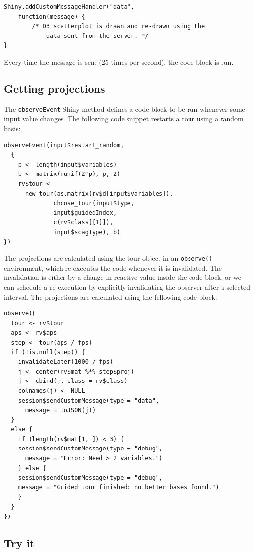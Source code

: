 \begin{verbatim}
Shiny.addCustomMessageHandler("data",
    function(message) {
        /* D3 scatterplot is drawn and re-drawn using the
            data sent from the server. */
}
\end{verbatim}

Every time the message is sent (25 times per second), the code-block is
run.

\hypertarget{getting-projections}{%
\subsection{Getting projections}\label{getting-projections}}

The \texttt{observeEvent} Shiny method defines a code block to be run
whenever some input value changes. The following code snippet restarts a
tour using a random basis:

\begin{verbatim}
observeEvent(input$restart_random,
  {
    p <- length(input$variables)
    b <- matrix(runif(2*p), p, 2)
    rv$tour <- 
      new_tour(as.matrix(rv$d[input$variables]),
              choose_tour(input$type, 
              input$guidedIndex,
              c(rv$class[[1]]), 
              input$scagType), b)
})
\end{verbatim}

The projections are calculated using the tour object in an
\texttt{observe()} environment, which re-executes the code whenever it
is invalidated. The invalidation is either by a change in reactive value
inside the code block, or we can schedule a re-execution by explicitly
invalidating the observer after a selected interval. The projections are
calculated using the following code block:

\begin{verbatim}
observe({
  tour <- rv$tour
  aps <- rv$aps
  step <- tour(aps / fps)
  if (!is.null(step)) {
    invalidateLater(1000 / fps)
    j <- center(rv$mat %*% step$proj)
    j <- cbind(j, class = rv$class)
    colnames(j) <- NULL
    session$sendCustomMessage(type = "data", 
      message = toJSON(j))
  }
  else {
    if (length(rv$mat[1, ]) < 3) {
    session$sendCustomMessage(type = "debug", 
      message = "Error: Need > 2 variables.")
    } else {
    session$sendCustomMessage(type = "debug", 
    message = "Guided tour finished: no better bases found.")
    }
  }
})
\end{verbatim}

\hypertarget{try-it}{%
\subsection{Try it}\label{try-it}}

